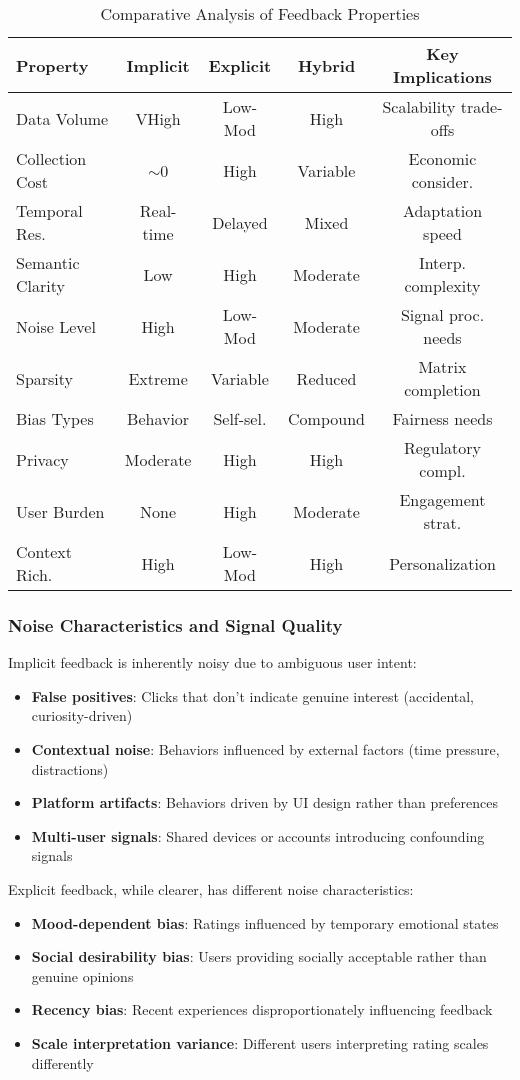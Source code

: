 \begin{table}[h]
\centering
\tiny
\caption{Comparative Analysis of Feedback Properties}
\label{tab:feedback_properties_detailed}
\begin{tabular}{@{}lcccc@{}}
\toprule
Property & Implicit & Explicit & Hybrid & Key Implications \\
\midrule
Data Volume & VHigh & Low-Mod & High & Scalability trade-offs \\
Collection Cost & $\sim$0 & High & Variable & Economic consider. \\
Temporal Res. & Real-time & Delayed & Mixed & Adaptation speed \\
Semantic Clarity & Low & High & Moderate & Interp. complexity \\
Noise Level & High & Low-Mod & Moderate & Signal proc. needs \\
Sparsity & Extreme & Variable & Reduced & Matrix completion \\
Bias Types & Behavior & Self-sel. & Compound & Fairness needs \\
Privacy & Moderate & High & High & Regulatory compl. \\
User Burden & None & High & Moderate & Engagement strat. \\
Context Rich. & High & Low-Mod & High & Personalization \\
\bottomrule
\end{tabular}
\end{table}

\subsubsection{Noise Characteristics and Signal Quality}

Implicit feedback is inherently noisy due to ambiguous user intent:
\begin{itemize}
    \item \textbf{False positives}: Clicks that don't indicate genuine interest (accidental, curiosity-driven)
    \item \textbf{Contextual noise}: Behaviors influenced by external factors (time pressure, distractions)
    \item \textbf{Platform artifacts}: Behaviors driven by UI design rather than preferences
    \item \textbf{Multi-user signals}: Shared devices or accounts introducing confounding signals
\end{itemize}

Explicit feedback, while clearer, has different noise characteristics:
\begin{itemize}
    \item \textbf{Mood-dependent bias}: Ratings influenced by temporary emotional states
    \item \textbf{Social desirability bias}: Users providing socially acceptable rather than genuine opinions
    \item \textbf{Recency bias}: Recent experiences disproportionately influencing feedback
    \item \textbf{Scale interpretation variance}: Different users interpreting rating scales differently
\end{itemize}

